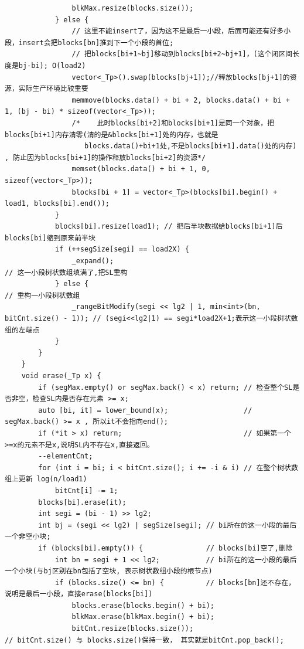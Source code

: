 \documentclass[UTF8,twoside]{ctexart}
\begin{document}
\begin{lstlisting}
                blkMax.resize(blocks.size());
            } else {
                // 这里不能insert了，因为这不是最后一小段，后面可能还有好多小段，insert会把blocks[bn]推到下一个小段的首位;
                // 把blocks[bi+1~bj]移动到blocks[bi+2~bj+1]，(这个闭区间长度是bj-bi); O(load2)
                vector<_Tp>().swap(blocks[bj+1]);//释放blocks[bj+1]的资源，实际生产环境比较重要
                memmove(blocks.data() + bi + 2, blocks.data() + bi + 1, (bj - bi) * sizeof(vector<_Tp>));
                /*    此时blocks[bi+2]和blocks[bi+1]是同一个对象，把blocks[bi+1]内存清零(清的是&blocks[bi+1]处的内存，也就是
                   blocks.data()+bi+1处,不是blocks[bi+1].data()处的内存) , 防止因为blocks[bi+1]的操作释放blocks[bi+2]的资源*/
                memset(blocks.data() + bi + 1, 0, sizeof(vector<_Tp>));
                blocks[bi + 1] = vector<_Tp>(blocks[bi].begin() + load1, blocks[bi].end());
            }
            blocks[bi].resize(load1); // 把后半块数据给blocks[bi+1]后blocks[bi]缩到原来前半块
            if (++segSize[segi] == load2X) {
                _expand();                                                         // 这一小段树状数组填满了,把SL重构
            } else {                                                               // 重构一小段树状数组
                _rangeBitModify(segi << lg2 | 1, min<int>(bn, bitCnt.size() - 1)); // (segi<<lg2|1) == segi*load2X+1;表示这一小段树状数组的左端点
            }
        }
    }
    void erase(_Tp x) {
        if (segMax.empty() or segMax.back() < x) return; // 检查整个SL是否非空，检查SL内是否存在元素 >= x;
        auto [bi, it] = lower_bound(x);                  // segMax.back() >= x , 所以it不会指向end();
        if (*it > x) return;                             // 如果第一个>=x的元素不是x,说明SL内不存在x,直接返回。
        --elementCnt;
        for (int i = bi; i < bitCnt.size(); i += -i & i) // 在整个树状数组上更新 log(n/load1)
            bitCnt[i] -= 1;
        blocks[bi].erase(it);
        int segi = (bi - 1) >> lg2;
        int bj = (segi << lg2) | segSize[segi]; // bi所在的这一小段的最后一个非空小块;
        if (blocks[bi].empty()) {               // blocks[bi]空了,删除
            int bn = segi + 1 << lg2;           // bi所在的这一小段的最后一个小块(与bj区别在bn包括了空块, 表示树状数组小段的根节点)
            if (blocks.size() <= bn) {          // blocks[bn]还不存在，说明是最后一小段，直接erase(blocks[bi])
                blocks.erase(blocks.begin() + bi);
                blkMax.erase(blkMax.begin() + bi);
                bitCnt.resize(blocks.size());                            // bitCnt.size() 与 blocks.size()保持一致， 其实就是bitCnt.pop_back();

\end{lstlisting}
\end{document}
